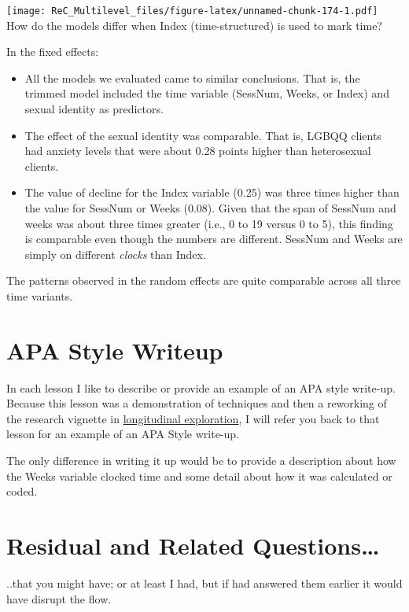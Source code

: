 \documentclass[
  11pt,
]{book}
\providecommand{\tightlist}{%
  \setlength{\itemsep}{0pt}\setlength{\parskip}{0pt}}
\begin{document}
\texttt{[image: ReC\_Multilevel\_files/figure-latex/unnamed-chunk-174-1.pdf]}
How do the models differ when Index (time-structured) is used to mark time?

In the fixed effects:

\begin{itemize}
\tightlist
\item
  All the models we evaluated came to similar conclusions. That is, the trimmed model included the time variable (SessNum, Weeks, or Index) and sexual identity as predictors.
\item
  The effect of the sexual identity was comparable. That is, LGBQQ clients had anxiety levels that were about 0.28 points higher than heterosexual clients.
\item
  The value of decline for the Index variable (0.25) was three times higher than the value for SessNum or Weeks (0.08). Given that the span of SessNum and weeks was about three times greater (i.e., 0 to 19 versus 0 to 5), this finding is comparable even though the numbers are different. SessNum and Weeks are simply on different \emph{clocks} than Index.
\end{itemize}

The patterns observed in the random effects are quite comparable across all three time variants.

\hypertarget{apa-style-writeup-3}{%
\section{APA Style Writeup}\label{apa-style-writeup-3}}

In each lesson I like to describe or provide an example of an APA style write-up. Because this lesson was a demonstration of techniques and then a reworking of the research vignette in \href{MLMexplore}{longitudinal exploration}, I will refer you back to that lesson for an example of an APA Style write-up.

The only difference in writing it up would be to provide a description about how the Weeks variable clocked time and some detail about how it was calculated or coded.

\hypertarget{residual-and-related-questions-3}{%
\section{Residual and Related Questions\ldots{}}\label{residual-and-related-questions-3}}

..that you might have; or at least I had, but if had answered them earlier it would have disrupt the flow.
\end{document}

